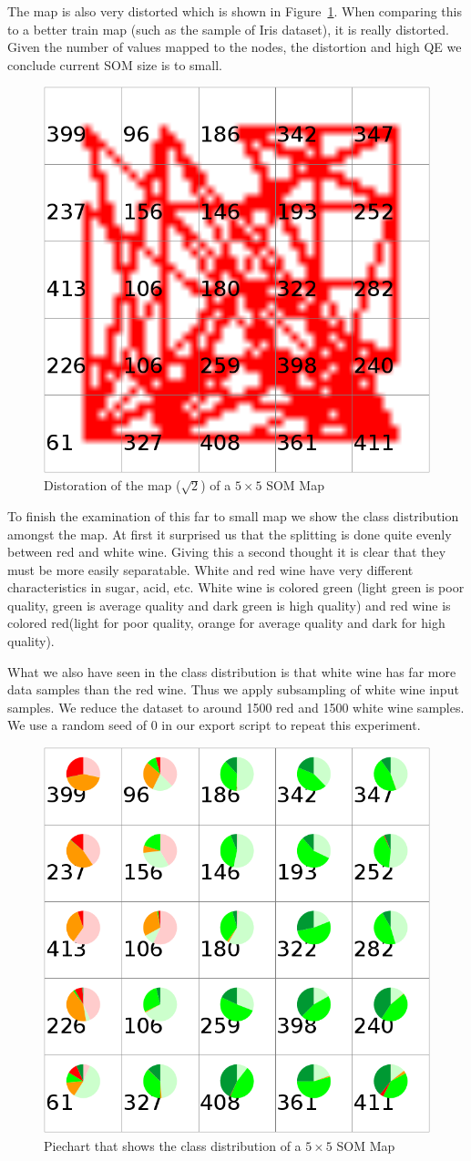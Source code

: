 \documentclass{acm_proc_article-sp}
\begin{document}
The map is also very distorted which is shown in Figure~\ref{fig:wine-small-dist-sqrt-2}.
When comparing this to a better train map (such as the sample of Iris dataset), it is
really distorted. Given the number of values mapped to the nodes, the distortion and
high QE we conclude current SOM size is to small.

\begin{figure}
\centering
\includegraphics[width=0.5\linewidth]{img/wine-small-dist-sqrt-2}
\caption{Distoration of the map ($\sqrt{2}$) of a $5\times5$ SOM Map}
\label{fig:wine-small-dist-sqrt-2}
\end{figure}

To finish the examination of this far to small map we show the class distribution amongst the map.
At first it surprised us that the splitting is done quite evenly between red and
white wine. Giving this a second thought it is clear that they must be more easily separatable.
White and red wine have very different characteristics in sugar, acid, etc. 
White wine is colored green (light green is poor quality, green is average quality and dark green is high quality) and
red wine is colored red(light for poor quality, orange for average quality and dark for high quality).

What we also have seen in the class distribution is that white wine has far more data samples
than the red wine. Thus we apply subsampling of white wine input samples. We reduce the dataset to around 1500 red and 1500 white wine samples.
We use a random seed of 0 in our export script to repeat this experiment.

\begin{figure}
\centering
\includegraphics[width=0.5\linewidth]{img/wine-small-pie-cls}
\caption{Piechart that shows the class distribution of a $5\times5$ SOM Map}
\label{fig:wine-small-pie-cls}
\end{figure}
\end{document}
